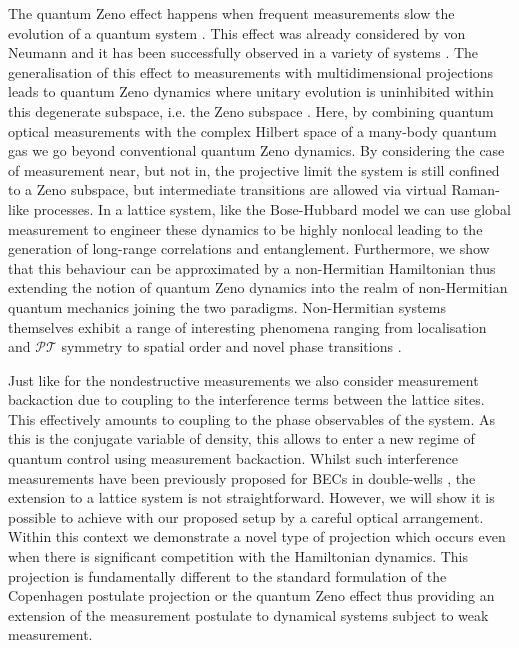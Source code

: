 The quantum Zeno effect happens when frequent measurements slow the
evolution of a quantum system \cite{misra1977, facchi2008}. This
effect was already considered by von Neumann and it has been
successfully observed in a variety of systems \cite{itano1990,
  nagels1997, kwiat1999, balzer2000, streed2006, hosten2006,
  bernu2008}. The generalisation of this effect to measurements with
multidimensional projections leads to quantum Zeno dynamics where
unitary evolution is uninhibited within this degenerate subspace,
i.e. the Zeno subspace \cite{facchi2008, raimond2010, raimond2012,
  signoles2014}. Here, by combining quantum optical measurements with
the complex Hilbert space of a many-body quantum gas we go beyond
conventional quantum Zeno dynamics. By considering the case of
measurement near, but not in, the projective limit the system is still
confined to a Zeno subspace, but intermediate transitions are allowed
via virtual Raman-like processes. In a lattice system, like the
Bose-Hubbard model we can use global measurement to engineer these
dynamics to be highly nonlocal leading to the generation of long-range
correlations and entanglement. Furthermore, we show that this
behaviour can be approximated by a non-Hermitian Hamiltonian thus
extending the notion of quantum Zeno dynamics into the realm of
non-Hermitian quantum mechanics joining the two
paradigms. Non-Hermitian systems themselves exhibit a range of
interesting phenomena ranging from localisation \cite{hatano1996,
  refael2006} and {\selectfont $\mathcal{PT}$
  symmetry} \cite{bender1998, giorgi2010, zhang2013} to spatial order
\cite{otterbach2014} and novel phase transitions \cite{lee2014prx,
  lee2014prl}.

Just like for the nondestructive measurements we also consider
measurement backaction due to coupling to the interference terms
between the lattice sites. This effectively amounts to coupling to the
phase observables of the system. As this is the conjugate variable of
density, this allows to enter a new regime of quantum control using
measurement backaction. Whilst such interference measurements have
been previously proposed for BECs in double-wells \cite{cirac1996,
  castin1997, ruostekoski1997}, the extension to a lattice system is
not straightforward. However, we will show it is possible to achieve
with our proposed setup by a careful optical arrangement. Within this
context we demonstrate a novel type of projection which occurs even
when there is significant competition with the Hamiltonian
dynamics. This projection is fundamentally different to the standard
formulation of the Copenhagen postulate projection or the quantum Zeno
effect \cite{misra1977, facchi2008} thus providing an extension of the
measurement postulate to dynamical systems subject to weak
measurement.

